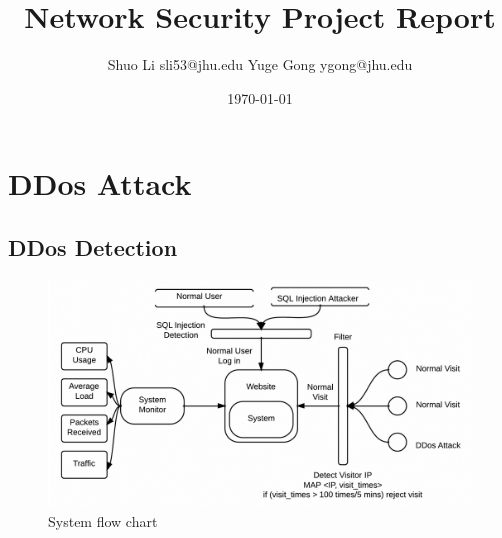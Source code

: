 \documentclass[12pt]{article}
\begin{document}
\title{Network Security Project Report}
\author{Shuo Li sli53@jhu.edu Yuge Gong ygong@jhu.edu}
\date{\today}
\maketitle
\section{DDos Attack}

\subsection{DDos Detection}

\begin{figure}
\includegraphics[scale=0.23]{flowchart.png}
\caption{System flow chart}
\end{figure}
\end{document}
